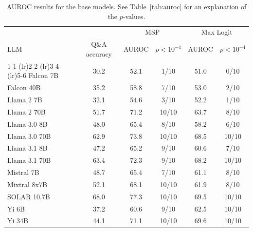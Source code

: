 \begin{table}[h!]
\caption{AUROC results for the base models. See Table~\ref{tab:auroc} for an explanation of the $p$-values.}
\label{tab:auroc_base}
\centering
\begin{tabular}{lccccc}
\toprule
& & \multicolumn{2}{c}{MSP} & \multicolumn{2}{c}{Max Logit} \\ 
LLM & Q\&A accuracy & AUROC & $p < 10^{-4}$ & AUROC & $p < 10^{-4}$ \\ 
\cmidrule(lr){1-1} \cmidrule(lr){2-2} \cmidrule(lr){3-4} \cmidrule(lr){5-6} 
Falcon 7B & 30.2 & 52.1 & 1/10 & 51.0 & 0/10\\
Falcon 40B & 35.2 & 58.8 & 7/10 & 53.0 & 2/10\\
Llama 2 7B & 32.1 & 54.6 & 3/10 & 52.2 & 1/10\\
Llama 2 70B & 51.7 & 71.2 & 10/10 & 63.7 & 8/10\\
Llama 3.0 8B & 48.0 & 65.4 & 8/10 & 58.2 & 6/10\\
Llama 3.0 70B & 62.9 & 73.8 & 10/10 & 68.5 & 10/10\\
Llama 3.1 8B & 47.2 & 65.2 & 9/10 & 60.6 & 7/10\\
Llama 3.1 70B & 63.4 & 72.3 & 9/10 & 68.2 & 10/10\\
Mistral 7B & 48.7 & 65.4 & 7/10 & 61.1 & 8/10\\
Mixtral 8x7B & 52.1 & 68.1 & 10/10 & 61.9 & 8/10\\
SOLAR 10.7B & 68.0 & 77.3 & 10/10 & 69.5 & 10/10\\
Yi 6B & 37.2 & 60.6 & 9/10 & 62.5 & 10/10\\
Yi 34B & 44.1 & 71.1 & 10/10 & 69.6 & 10/10\\
\bottomrule
\end{tabular}
\end{table}
